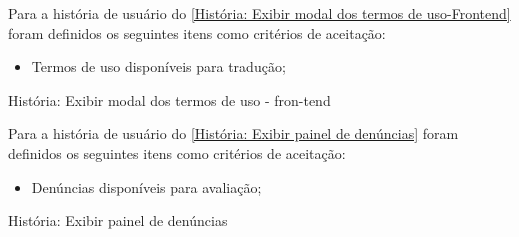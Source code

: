 Para a história de usuário do \autoref{História: Exibir modal dos termos de uso-Frontend} foram definidos os seguintes itens como critérios de aceitação:

\begin{itemize}
\item Termos de uso disponíveis para tradução;
\end{itemize}

\def\arraystretch{2}
\begin{quadro}[htb]
\centering
\ABNTEXfontereduzida
\caption[História: Exibir modal dos termos de uso - Frontend]{História: Exibir modal dos termos de uso - fron-tend}
\label{História: Exibir modal dos termos de uso-Frontend}
\end{quadro}
\FloatBarrier

Para a história de usuário do \autoref{História: Exibir painel de denúncias} foram definidos os seguintes itens como critérios de aceitação:

\begin{itemize}
\item Denúncias disponíveis para avaliação;
\end{itemize}

\def\arraystretch{2}
\begin{quadro}[htb]
\centering
\ABNTEXfontereduzida
\caption[História: Exibir painel de denúncias]{História: Exibir painel de denúncias}
\label{História: Exibir painel de denúncias}
\end{quadro}
\FloatBarrier

